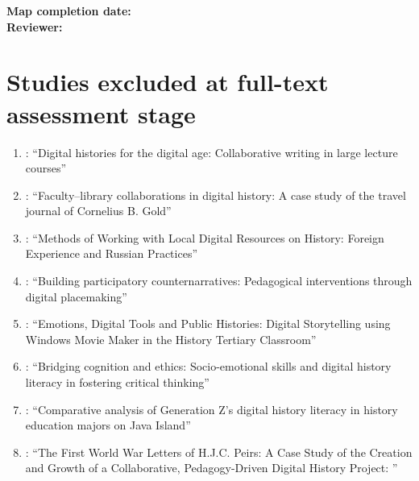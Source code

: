 \documentclass[
hf,
]{ceurart}
\begin{document}
\vspace{1cm}

\noindent\textbf{Map completion date:} \underline{\hspace{4cm}}\\
\textbf{Reviewer:} \underline{\hspace{6cm}}

\section{Studies excluded at full-text assessment stage} \label{sec:appendix-d}


\begin{enumerate}
    \item \citet{Soh2013}: ``Digital histories for the digital age: Collaborative writing in large lecture courses''
    
    \item \citet{Davis2017}: ``Faculty–library collaborations in digital history: A case study of the travel journal of Cornelius B. Gold''
    
    \item \citet{Maslova2021}: ``Methods of Working with Local Digital Resources on History: Foreign Experience and Russian Practices''
    
    \item \citet{frith2021}: ``Building participatory counternarratives: Pedagogical interventions through digital placemaking''
    
    \item \citet{Coleborne2011}: ``Emotions, Digital Tools and Public Histories: Digital Storytelling using Windows Movie Maker in the History Tertiary Classroom''
    
    \item \citet{Nurhasanah2025}: ``Bridging cognition and ethics: Socio-emotional skills and digital history literacy in fostering critical thinking''
    
    \item \citet{Kumalasari2024}: ``Comparative analysis of Generation Z's digital history literacy in history education majors on Java Island''
    
    \item \citet{Lucadamo2024231}: ``The First World War Letters of H.J.C. Peirs: A Case Study of the Creation and Growth of a Collaborative, Pedagogy-Driven Digital History Project: ''
    

\end{enumerate}
\end{document}
